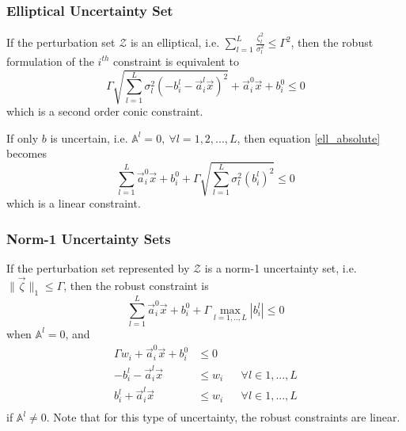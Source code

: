 \subsubsection{Elliptical Uncertainty Set}
If the perturbation set $\mathcal{Z}$ is an elliptical, i.e. $\textstyle{\sum}_{l=1}^L\frac{\zeta_l^2}{\sigma_l^2} \leq \Gamma^2$,
then the robust formulation of the $i^{th}$ constraint is equivalent to
\begin{equation}
\Gamma \sqrt{\textstyle{\sum}_{l=1}^L \sigma_l^2(- b^l_{i} - \vec{a}^l_{i}\vec{x})^2} + \vec{a}^0_{i}\vec{x} + b^0_{i} \leq 0
\label{ell_absolute}
\end{equation}
which is a second order conic constraint.

If only $b$ is uncertain, i.e. $\mathbb{A}^l = 0,~\forall l = 1,2,...,L$, then equation \eqref{ell_absolute} becomes
\begin{equation}
\textstyle{\sum}_{l=1}^L \vec{a}^0_{i}\vec{x} + b^0_{i} + \Gamma \sqrt{\textstyle{\sum}_{l=1}^L \sigma_l^2(b^l_{i})^2} \leq 0
\label{ell_coeff}
\end{equation}
which is a linear constraint.

\subsubsection{Norm-1 Uncertainty Sets}

If the perturbation set represented by $\mathcal{Z}$ is a norm-1 uncertainty set, i.e. $\|\vec{\zeta}\|_1 \leq \Gamma$,
then the robust constraint is
\begin{equation}
\textstyle{\sum}_{l=1}^L \vec{a}^0_{i}\vec{x} + b^0_{i} + \Gamma \max_{l=1,..,L} |b^l_{i}| \leq 0
\label{rom_coeff}
\end{equation}
when $\mathbb{A}^l = 0$, and 
\begin{equation}
\begin{aligned}
\Gamma w_{i} + \vec{a}^0_{i}\vec{x} + b^0_{i} &\leq 0\\
- b^l_{i} - \vec{a}^l_{i}\vec{x} &\leq w_{i} &&\forall l \in 1,...,L\\
b^l_{i} + \vec{a}^l_{i}\vec{x} &\leq w_{i} &&\forall l \in 1,...,L\\
\end{aligned}
\label{rom_linear}
\end{equation}
if $\mathbb{A}^l \neq 0$. Note that for this type of uncertainty, the robust constraints are linear.
